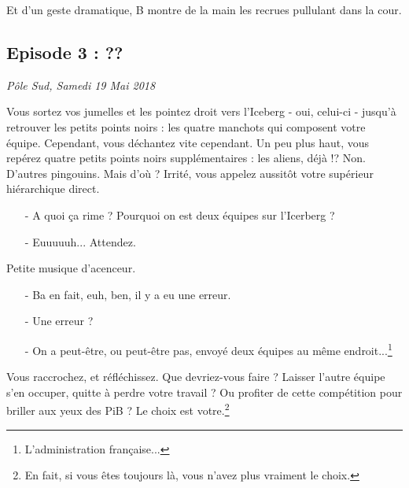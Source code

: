 Et d'un geste dramatique, B montre de la main les recrues pullulant dans la cour.

\subsection{Episode 3 : ??}
\hfill \textit{Pôle Sud, Samedi 19 Mai 2018}

Vous sortez vos jumelles et les pointez droit vers l'Iceberg - oui, celui-ci -
jusqu'à retrouver les petits points noirs : les quatre manchots qui composent
votre équipe.
Cependant, vous déchantez vite cependant. Un peu plus haut, vous repérez
quatre petits points noirs supplémentaires : les aliens, déjà !? Non. D'autres
pingouins. Mais d'où ?
Irrité, vous appelez aussitôt votre supérieur hiérarchique direct.

\begin{itemize}
    \item[-] A quoi ça rime ? Pourquoi on est deux équipes sur l'Icerberg ?
    \item[-] Euuuuuh... Attendez.
\end{itemize}

Petite musique d'acenceur.

\begin{itemize}
    \item[-] Ba en fait, euh, ben, il y a eu une erreur.
    \item[-] Une erreur ?
    \item[-] On a peut-être, ou peut-être pas, envoyé deux équipes au même
        endroit...\footnote{L'administration française...}
\end{itemize}

Vous raccrochez, et réfléchissez. Que devriez-vous faire ? Laisser l'autre
équipe s'en occuper, quitte à perdre votre travail ? Ou profiter de cette
compétition pour briller aux yeux des PiB ? Le choix est votre.\footnote{En
fait, si vous êtes toujours là, vous n'avez plus vraiment le choix.}

